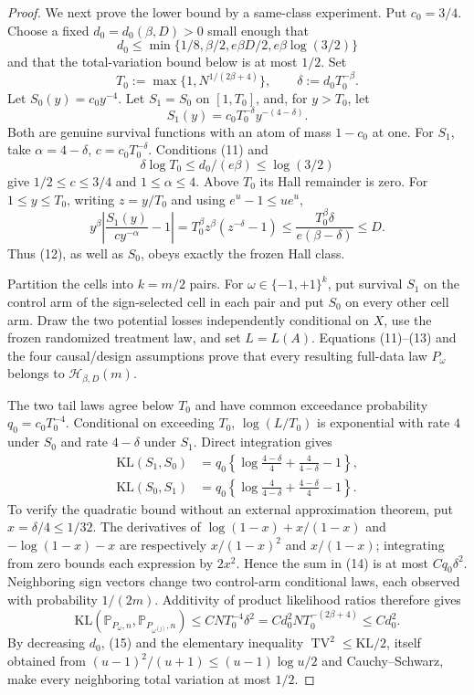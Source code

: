 \documentclass{article}
\begin{document}
\begin{proof}
We next prove the lower bound by a same-class experiment.  Put \(c_0=3/4\).  Choose a fixed \(d_0=d_0(\beta,D)>0\) small enough that
\[
d_0\leq\min\{1/8,\beta/2,e\beta D/2,e\beta\log(3/2)\}                  \tag{11}
\]
and that the total-variation bound below is at most \(1/2\).  Set
\[
T_0:=\max\{1,N^{1/(2\beta+4)}\},\qquad
\delta:=d_0T_0^{-\beta}.
\]
Let \(S_0(y)=c_0y^{-4}\).  Let \(S_1=S_0\) on \([1,T_0]\), and, for \(y>T_0\), let
\[
S_1(y)=c_0T_0^{-\delta}y^{-(4-\delta)}.                                  \tag{12}
\]
Both are genuine survival functions with an atom of mass \(1-c_0\) at one.  For \(S_1\), take \(\alpha=4-\delta\), \(c=c_0T_0^{-\delta}\).  Conditions (11) and
\[
\delta\log T_0\leq d_0/(e\beta)\leq\log(3/2)
\]
give \(1/2\leq c\leq3/4\) and \(1\leq\alpha\leq4\).  Above \(T_0\) its Hall remainder is zero.  For \(1\leq y\leq T_0\), writing \(z=y/T_0\) and using \(e^u-1\leq ue^u\),
\[
y^\beta\left|\frac{S_1(y)}{cy^{-\alpha}}-1\right|
=T_0^\beta z^\beta(z^{-\delta}-1)
\leq\frac{T_0^\beta\delta}{e(\beta-\delta)}
\leq D.                                                                 \tag{13}
\]
Thus (12), as well as \(S_0\), obeys exactly the frozen Hall class.

Partition the cells into \(k=m/2\) pairs.  For \(\omega\in\{-1,+1\}^k\), put survival \(S_1\) on the control arm of the sign-selected cell in each pair and put \(S_0\) on every other cell arm.  Draw the two potential losses independently conditional on \(X\), use the frozen randomized treatment law, and set \(L=L(A)\).  Equations (11)--(13) and the four causal/design assumptions prove that every resulting full-data law \(P_\omega\) belongs to \(\mathcal H_{\beta,D}(m)\).

The two tail laws agree below \(T_0\) and have common exceedance probability \(q_0=c_0T_0^{-4}\).  Conditional on exceeding \(T_0\), \(\log(L/T_0)\) is exponential with rate \(4\) under \(S_0\) and rate \(4-\delta\) under \(S_1\).  Direct integration gives
\[
\begin{split}
\mathrm{KL}(S_1,S_0)&=q_0\left\{\log\frac{4-\delta}{4}+\frac4{4-\delta}-1\right\},\\
\mathrm{KL}(S_0,S_1)&=q_0\left\{\log\frac4{4-\delta}+\frac{4-\delta}{4}-1\right\}.
\end{split}                                                              \tag{14}
\]
To verify the quadratic bound without an external approximation theorem, put \(x=\delta/4\leq1/32\).  The derivatives of \(\log(1-x)+x/(1-x)\) and \(-\log(1-x)-x\) are respectively \(x/(1-x)^2\) and \(x/(1-x)\); integrating from zero bounds each expression by \(2x^2\).  Hence the sum in (14) is at most \(Cq_0\delta^2\).  Neighboring sign vectors change two control-arm conditional laws, each observed with probability \(1/(2m)\).  Additivity of product likelihood ratios therefore gives
\[
\mathrm{KL}(\mathbb P_{P_\omega,n},\mathbb P_{P_{\omega^{(j)}},n})
\leq C N T_0^{-4}\delta^2
=C d_0^2 N T_0^{-(2\beta+4)}
\leq C d_0^2.                                                            \tag{15}
\]
By decreasing \(d_0\), (15) and the elementary inequality \(\operatorname{TV}^2\leq\mathrm{KL}/2\), itself obtained from \((u-1)^2/(u+1)\leq(u-1)\log u/2\) and Cauchy--Schwarz, make every neighboring total variation at most \(1/2\).


\end{proof}
\end{document}
